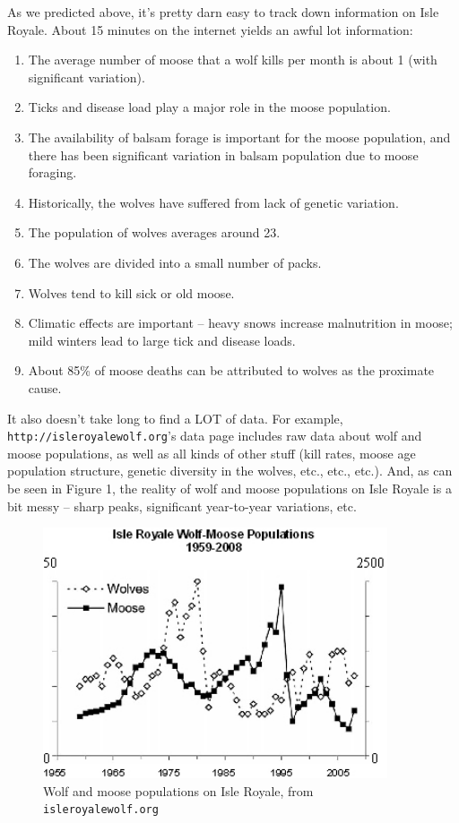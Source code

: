 \documentclass{tufte-handout}
\begin{document}
As we predicted above, it's pretty darn easy to track down information on Isle Royale.  About 15 minutes on the internet yields an awful lot information: 
\begin{enumerate}
\item The average number of moose that a wolf kills per month is about 1 (with significant variation).
\item Ticks and disease load play a major role in the moose population.
\item The availability of balsam forage is important for the moose population, and there has been significant variation in balsam population due to moose foraging.
\item Historically, the wolves have suffered from lack of genetic variation.
\item The population of wolves averages around 23.
\item The wolves are divided into a small number of packs.
\item Wolves tend to kill sick or old moose.
\item Climatic effects are important -- heavy snows increase malnutrition in moose; mild winters lead to large tick and disease loads.
\item About 85\% of moose deaths can be attributed to wolves as the proximate cause.
\end{enumerate}

It also doesn't take long to find a LOT of data.  For example, {\tt http://isleroyalewolf.org}'s data page includes raw data about wolf and moose populations, as well as all kinds of other stuff (kill rates, moose age population structure, genetic diversity in the wolves, etc., etc., etc.).  And, as can be seen in Figure 1, the reality of wolf and moose populations on Isle Royale is a bit messy -- sharp peaks, significant year-to-year variations, etc.

\begin{figure}
\includegraphics[width=4in]{figs/wolfmoosedata.jpg}
\caption{Wolf and moose populations on Isle Royale, from {\tt isleroyalewolf.org}}
\end{figure}
\end{document}
